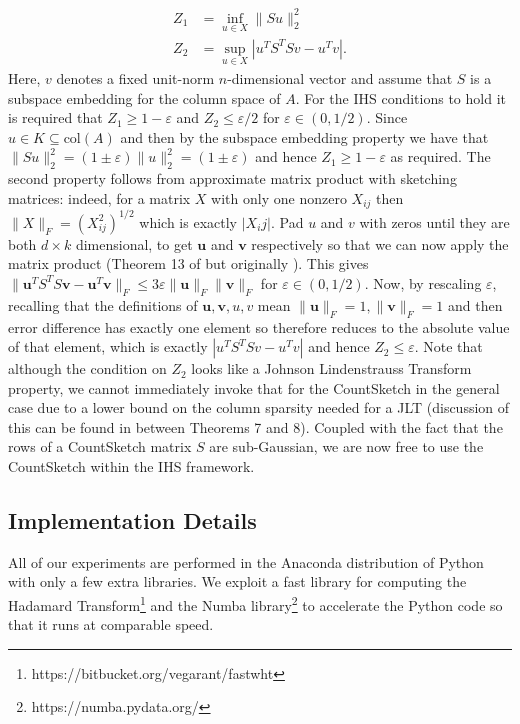 \documentclass[twoside]{article}
\newcommand{\eps}{\varepsilon}
\newcommand{\mat}[1]{\boldsymbol{#1}}
\theoremstyle{definition}\newtheorem{thm}{Theorem}[section]
\theoremstyle{definition}\newtheorem{mydef}[thm]{Definition}
\theoremstyle{definition}\newtheorem{rem}[thm]{Remark}
\theoremstyle{definition}\newtheorem{prop}[thm]{Proposition}
\theoremstyle{definition}\newtheorem{example}[thm]{Example}
\theoremstyle{definition}\newtheorem{claim}[thm]{Claim}
\theoremstyle{definition}\newtheorem{Qu}[thm]{Question}
\theoremstyle{definition}\newtheorem{Lemma}[thm]{Lemma}
\theoremstyle{definition}\newtheorem{Cor}[thm]{Corollary}
\theoremstyle{definition}\newtheorem{Fact}[]{Fact}
\begin{document}
\begin{align}
  Z_1 &= \inf_{u \in X} \|Su\|_2^2 \\
  Z_2 &= \sup_{u \in X} | u^T S^T S v - u^T v |.
\end{align}
\noindent Here, $v$ denotes a fixed unit-norm $n$-dimensional vector and assume
that $S$ is a subspace embedding for the column space of $A$.
For the IHS conditions to hold it is required that $Z_1 \ge 1-\eps$ and
$Z_2 \le \eps/2$ for $\eps \in (0,1/2)$.
Since $ u \in K \subseteq \text{col}(A)$ and then by the subspace embedding
property we have that $\|Su\|_2^2 = (1 \pm \eps)\|u\|_2^2 = (1 \pm \eps)$ and
hence $Z_1  \ge 1-\eps$ as required.
The second property follows from approximate matrix product with sketching
matrices:
indeed, for a matrix $X$ with only one nonzero $X_{ij}$ then $\|X\|_F = (X_{ij}^2)^{1/2}$
which is exactly $|X_ij|$.
Pad $u$ and $v$ with zeros until they are both $d \times k$ dimensional, to get
$\mat{u}$ and $\mat{v}$ respectively so that we can now apply the matrix product
(Theorem 13 of \cite{woodruff2014sketching} but originally \cite{kane2014sparser}).
This gives $\|\mat{u}^T S^TS \mat{v} - \mat{u}^T\mat{v}\|_F \le 3 \eps \|\mat{u}\|_F \|\mat{v}\|_F$
for $\eps \in (0,1/2)$.
Now, by rescaling $\eps$, recalling that the definitions of $\mat{u},\mat{v},u,v$
mean $\|\mat{u}\|_F = 1, \|\mat{v}\|_F=1$ and then error difference has exactly
one element so therefore reduces to the absolute value of that element, which is
exactly $| u^T S^T S v - u^T v |$ and hence $Z_2 \le \eps$.
Note that although the condition on $Z_2$ looks like a Johnson Lindenstrauss
Transform property, we cannot immediately invoke that for the CountSketch in the
general case due to a lower bound on the column sparsity needed for  a JLT
(discussion of this can be found in \cite{woodruff2014sketching} between Theorems
7 and 8).
Coupled with the fact that the rows of a CountSketch matrix $S$ are sub-Gaussian,
we are now free to use the CountSketch within the IHS framework.





\subsection{Implementation Details}

All of our experiments are performed in the Anaconda distribution of Python
with only a few extra libraries.
We exploit a fast library for computing the Hadamard
Transform\footnote{https://bitbucket.org/vegarant/fastwht} and the Numba
library\footnote{https://numba.pydata.org/} to accelerate the Python code
so that it runs at comparable speed.
\end{document}
